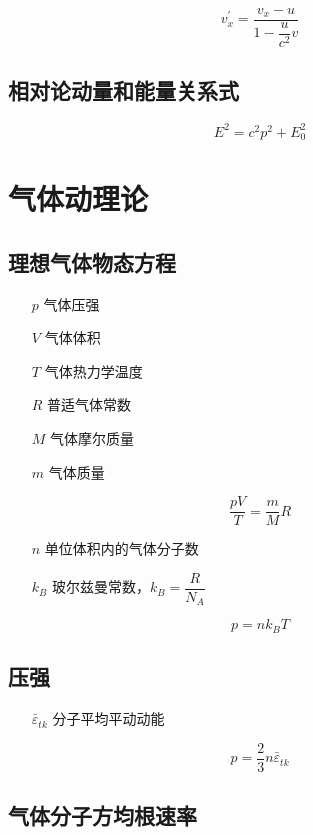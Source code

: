 \documentclass{article}
\begin{document}
\[v_x^\prime=\frac{v_x-u}{1-\dfrac u{c^2}v}\]

\subsection{相对论动量和能量关系式}

\[E^2=c^2p^2+E_0^2\]

\section{气体动理论}

\subsection{理想气体物态方程}

\begin{enumerate}
    \item[$p$] 气体压强
    \item[$V$] 气体体积
    \item[$T$] 气体热力学温度
    \item[$R$] 普适气体常数
    \item[$M$] 气体摩尔质量
    \item[$m$] 气体质量
\end{enumerate}

\[\frac{pV}T=\frac mMR\]

\begin{enumerate}
    \item[$n$] 单位体积内的气体分子数
    \item[$k_B$] 玻尔兹曼常数，$k_B=\dfrac R{N_A}$
\end{enumerate}

\[p=nk_BT\]

\subsection{压强}

\begin{enumerate}
    \item[$\bar\varepsilon_{tk}$] 分子平均平动动能
\end{enumerate}

\[p=\frac23n\bar\varepsilon_{tk}\]

\subsection{气体分子方均根速率}
\end{document}
